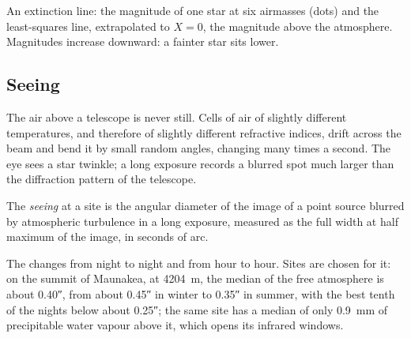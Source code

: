 \begin{omfigure}

{\small An extinction line: the magnitude of one star at six airmasses
(dots) and the least-squares line, extrapolated to $X = 0$, the magnitude
above the atmosphere. Magnitudes increase downward: a fainter star sits
lower.}
\end{omfigure}

\subsection*{Seeing}

The air above a telescope is never still. Cells of air of slightly different
temperatures, and therefore of slightly different refractive indices, drift
across the beam and bend it by small random angles, changing many times a
second. The eye sees a star twinkle; a long exposure records a blurred spot
much larger than the diffraction pattern of the telescope.

\begin{definition}[Seeing]\label{def:b1:observing-the-sky:seeing}
The \emph{seeing} at a site is the angular diameter of the
image of a point source blurred by atmospheric turbulence in a long
exposure, measured as the full width at half maximum of the image, in
seconds of arc.
\end{definition}

The  changes from night to night and from hour to hour. Sites are
chosen for it: on the summit of Maunakea, at \qty{4204}{m}, the median
 of the free atmosphere is about \ang{;;0.40}, from about \ang{;;0.45}
in winter to \ang{;;0.35} in summer, with the best tenth of the nights below
about \ang{;;0.25}; the same site has a median of only \qty{0.9}{mm} of
precipitable water vapour above it, which opens its infrared windows.


